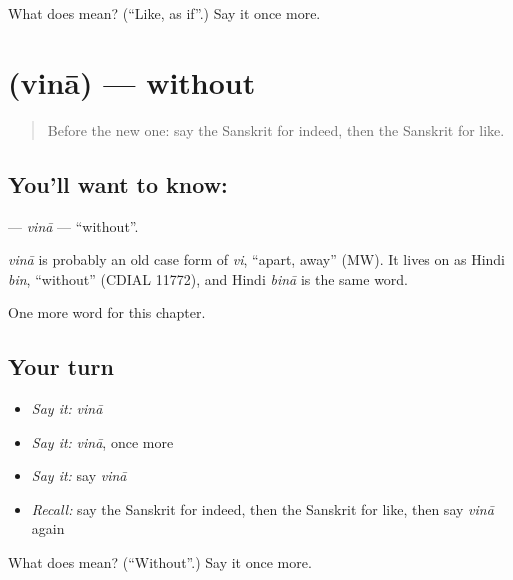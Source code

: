 \begin{tcolorbox}[breakable,colback=teal!4,colframe=teal!35!black,title={Before you move on}]
What does  mean? (\textquotedblleft{}Like, as if\textquotedblright{}.) Say it once more.
\end{tcolorbox}
\section[\texorpdfstring{\sk{विना} (vinā)}{विना (vinā)}]{ (vinā) — without}

\label{lesson:SA-C214-vina}



\begin{quote}
Before the new one: say the Sanskrit for indeed, then the Sanskrit for like.
\end{quote}

\subsection*{You'll want to know: }
\textbf{} — \emph{vinā} — \textquotedblleft{}without\textquotedblright{}.

\begin{cousinweb}
\emph{vinā} is probably an old case form of \emph{vi}, \textquotedblleft{}apart, away\textquotedblright{} (MW). It lives on as Hindi \emph{bin}, \textquotedblleft{}without\textquotedblright{} (CDIAL 11772), and Hindi \emph{binā} is the same word.
\end{cousinweb}

\begin{grammarlens}[title={What you've built}]
One more word for this chapter.
\end{grammarlens}

\subsection*{Your turn}
\begin{itemize}
\raggedright
  \item \emph{Say it:} \emph{vinā}
  \item \emph{Say it:} \emph{vinā}, once more
  \item \emph{Say it:} say \emph{vinā}
  \item \emph{Recall:} say the Sanskrit for indeed, then the Sanskrit for like, then say \emph{vinā} again
\end{itemize}

\begin{tcolorbox}[breakable,colback=teal!4,colframe=teal!35!black,title={Before you move on}]
What does  mean? (\textquotedblleft{}Without\textquotedblright{}.) Say it once more.
\end{tcolorbox}

